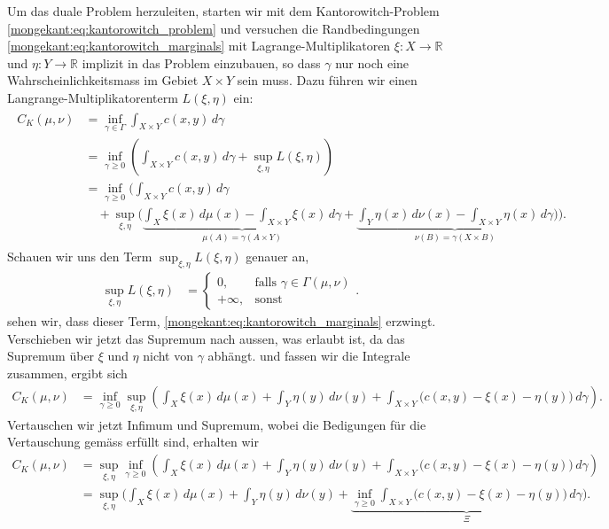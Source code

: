 Um das duale Problem herzuleiten,
starten wir mit dem Kantorowitch-Problem \eqref{mongekant:eq:kantorowitch_problem}
und versuchen die Randbedingungen \eqref{mongekant:eq:kantorowitch_marginals}
mit Lagrange-Multiplikatoren $\xi \colon X \to \mathbb{R}$ und
$\eta \colon Y \to \mathbb{R}$ implizit in das Problem einzubauen,
so dass $\gamma$ nur noch eine Wahrscheinlichkeitsmass im Gebiet $X\times Y$ sein muss.
Dazu führen wir einen Langrange-Multiplikatorenterm $L(\xi,\eta)$ ein:
\begin{align*}
\begin{aligned}
C_K(\mu, \nu)
&=
\inf_{\gamma \in \Gamma} \int_{X \times Y} c(x,y)\, d\gamma
\\
&=
\inf_{\gamma \geq 0} \left(
    \int_{X \times Y} c(x,y)\, d\gamma
+ \sup_{\xi, \eta} L(\xi, \eta)
\right)
\\
&=
\inf_{\gamma \geq 0} \Biggl(
\int_{X \times Y} c(x,y)\, d\gamma
\\
&\quad
+ \sup_{\xi, \eta} \Biggl(
\underbrace{
\int_X \xi(x)\, d\mu(x) - \int_{X \times Y} \xi(x)\, d\gamma
}_{\displaystyle \mu(A) = \gamma(A \times Y)}
+ \underbrace{
\int_Y \eta(x)\, d\nu(x) - \int_{X \times Y} \eta(x)\, d\gamma
}_{\displaystyle \nu(B) = \gamma(X \times B)}
\Biggr)\Biggr)
.
\end{aligned}
\end{align*}
Schauen wir uns den Term $\sup_{\xi, \eta} L(\xi, \eta)$ genauer an,
\begin{align*}
\sup_{\xi, \eta} L(\xi, \eta)
&=
\begin{cases}
0,
& \text{falls } \gamma \in \Gamma(\mu, \nu) \\
+\infty,
& \text{sonst}
\end{cases}
.
\end{align*}
sehen wir,
dass dieser Term,
\eqref{mongekant:eq:kantorowitch_marginals} erzwingt.
Verschieben wir jetzt das Supremum nach aussen,
was erlaubt ist,
da das Supremum über $\xi$ und $\eta$ nicht von $\gamma$ abhängt.
und fassen wir die Integrale zusammen,
ergibt sich
\begin{align*}
C_K(\mu, \nu)
&=
\inf_{\gamma \geq 0}
\sup_{\xi, \eta}
\left(
\int_X \xi(x)\, d\mu(x)
+ \int_Y \eta(y)\, d\nu(y)
+ \int_{X \times Y} \bigl(c(x,y) - \xi(x) - \eta(y)\bigr)\, d\gamma
\right)
.
\end{align*}
Vertauschen wir jetzt Infimum und Supremum,
wobei die Bedigungen für die Vertauschung gemäss \cite{mongekant:villani} erfüllt sind,
erhalten wir
\begin{align*}
C_K(\mu, \nu)
&=
\sup_{\xi, \eta}
\inf_{\gamma \geq 0}
\left(
\int_X \xi(x)\, d\mu(x)
+ \int_Y \eta(y)\, d\nu(y)
+ \int_{X \times Y} \bigl(c(x,y) - \xi(x) - \eta(y)\bigr)\, d\gamma
\right)
\\
&=
\sup_{\xi, \eta} 
\Biggl(
\int_X \xi(x)\, d\mu(x)
+ \int_Y \eta(y)\, d\nu(y)
+ \underbrace{
\inf_{\gamma \geq 0} \int_{X \times Y} \bigl(c(x,y) - \xi(x) - \eta(y)\bigr)\, d\gamma
}_{\displaystyle\Xi}
\Biggr)
.
\end{align*}
